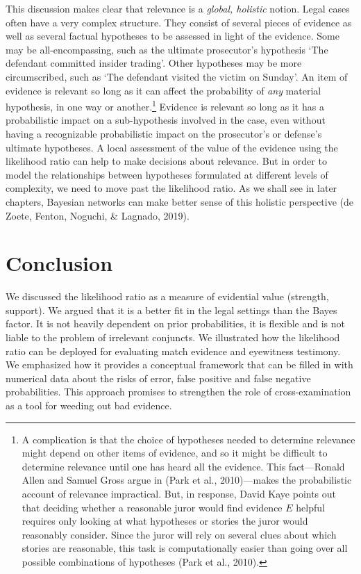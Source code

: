 \documentclass[
  letterpaper,
  DIV=11,
  numbers=noendperiod]{scrartcl}
\begin{document}
This discussion makes clear that relevance is a
\textit{global, holistic} notion. Legal cases often have a very complex
structure. They consist of several pieces of evidence as well as several
factual hypotheses to be assessed in light of the evidence. Some may be
all-encompassing, such as the ultimate prosecutor's hypothesis `The
defendant committed insider trading'. Other hypotheses may be more
circumscribed, such as `The defendant visited the victim on Sunday'. An
item of evidence is relevant so long as it can affect the probability of
\textit{any} material hypothesis, in one way or another.\footnote{A
  complication is that the choice of hypotheses needed to determine
  relevance might depend on other items of evidence, and so it might be
  difficult to determine relevance until one has heard all the evidence.
  This fact---Ronald Allen and Samuel Gross argue in (Park et al.,
  2010)---makes the probabilistic account of relevance impractical. But,
  in response, David Kaye points out that deciding whether a reasonable
  juror would find evidence \(E\) helpful requires only looking at what
  hypotheses or stories the juror would reasonably consider. Since the
  juror will rely on several clues about which stories are reasonable,
  this task is computationally easier than going over all possible
  combinations of hypotheses (Park et al., 2010).} Evidence is relevant
so long as it has a probabilistic impact on a sub-hypothesis involved in
the case, even without having a recognizable probabilistic impact on the
prosecutor's or defense's ultimate hypotheses. A local assessment of the
value of the evidence using the likelihood ratio can help to make
decisions about relevance. But in order to model the relationships
between hypotheses formulated at different levels of complexity, we need
to move past the likelihood ratio. As we shall see in later chapters,
Bayesian networks can make better sense of this holistic perspective (de
Zoete, Fenton, Noguchi, \& Lagnado, 2019).

\hypertarget{conclusion}{%
\section{Conclusion}\label{conclusion}}

We discussed the likelihood ratio as a measure of evidential value
(strength, support). We argued that it is a better fit in the legal
settings than the Bayes factor. It is not heavily dependent on prior
probabilities, it is flexible and is not liable to the problem of
irrelevant conjuncts. We illustrated how the likelihood ratio can be
deployed for evaluating match evidence and eyewitness testimony. We
emphasized how it provides a conceptual framework that can be filled in
with numerical data about the risks of error, false positive and false
negative probabilities. This approach promises to strengthen the role of
cross-examination as a tool for weeding out bad evidence.
\end{document}
